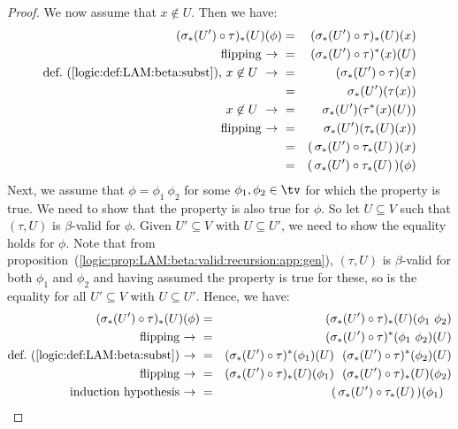 \begin{proof}
    \noindent
    We now assume that $x\not\in U$. Then we have:
        \begin{eqnarray*}(\sigma_{*}(U')\circ\tau)_{*}(U)(\phi)
            &=&(\sigma_{*}(U')\circ\tau)_{*}(U)(x)\\
            \mbox{flipping\ $\to$\ }
            &=&(\sigma_{*}(U')\circ\tau)^{*}(x)(U)\\
            \mbox{def.~(\ref{logic:def:LAM:beta:subst}), $x\not\in U\ \to\ $}
            &=&(\sigma_{*}(U')\circ\tau)(x)\\
            &=&\sigma_{*}(U')(\tau(x))\\
            \mbox{$x\not\in U\ \to\ $}
            &=&\sigma_{*}(U')(\tau^{*}(x)(U))\\
            \mbox{flipping\ $\to$\ }
            &=&\sigma_{*}(U')(\tau_{*}(U)(x))\\
            &=&(\,\sigma_{*}(U')\circ\tau_{*}(U)\,)(x)\\
            &=&(\,\sigma_{*}(U')\circ\tau_{*}(U)\,)(\phi)
        \end{eqnarray*}
    Next, we assume that $\phi=\phi_{1}\ \phi_{2}$ for some $\phi_{1},\phi_{2}
    \in\tv$ for which the property is true. We need to show that the
    property is also true for $\phi$. So let $U\subseteq V$ such that 
    $(\tau, U)$ is $\beta$-valid for $\phi$. Given $U'\subseteq V$ with
    $U\subseteq U'$, we need to show the equality holds for $\phi$. Note that 
    from proposition~(\ref{logic:prop:LAM:beta:valid:recursion:app:gen}), 
    $(\tau,U)$ is $\beta$-valid for both $\phi_{1}$ and $\phi_{2}$ and 
    having assumed the property is true for these, so is the equality for
    all $U'\subseteq V$ with $U\subseteq U'$. Hence, we have:
        \begin{eqnarray*}(\sigma_{*}(U')\circ\tau)_{*}(U)(\phi)
            &=&(\sigma_{*}(U')\circ\tau)_{*}(U)(\phi_{1}\ \phi_{2})\\
            \mbox{flipping\ $\to$\ }
            &=&(\sigma_{*}(U')\circ\tau)^{*}(\phi_{1}\ \phi_{2})(U)\\
            \mbox{def.~(\ref{logic:def:LAM:beta:subst})\ $\to$\ }
            &=&(\sigma_{*}(U')\circ\tau)^{*}(\phi_{1})(U)\ \ 
               (\sigma_{*}(U')\circ\tau)^{*}(\phi_{2})(U)\\
            \mbox{flipping\ $\to$\ }
            &=&(\sigma_{*}(U')\circ\tau)_{*}(U)(\phi_{1})\ \ 
               (\sigma_{*}(U')\circ\tau)_{*}(U)(\phi_{2})\\
            \mbox{induction hypothesis$\ \to\ $}
            &=&(\,\sigma_{*}(U')\circ\tau_{*}(U)\,)(\phi_{1})\ \ 

\end{eqnarray*}
\end{proof}
